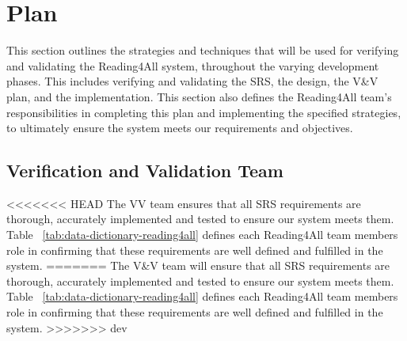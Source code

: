 \documentclass[12pt, titlepage]{article}
\begin{document}
\section{Plan}

This section outlines the strategies and techniques that will be used for verifying and validating the Reading4All system, throughout the varying development phases. 
This includes verifying and validating the SRS, the design, the V\&V plan, and the implementation. This section also defines the Reading4All team's responsibilities in 
completing this plan and implementing the specified strategies, to ultimately ensure the system meets our requirements and objectives.

\subsection{Verification and Validation Team}


<<<<<<< HEAD
The V\*V team ensures that all SRS requirements are thorough,
accurately implemented and tested to ensure our system meets them.
Table ~\ref{tab:data-dictionary-reading4all} defines each Reading4All
team members role in confirming that these requirements are well
defined and fulfilled in the system.
=======
The V\&V team will ensure that all SRS requirements are thorough, accurately implemented and tested to ensure our system meets them. 
Table ~\ref{tab:data-dictionary-reading4all} defines each Reading4All team members role in confirming that these requirements are well defined and fulfilled in the system.
>>>>>>> dev
\end{document}
